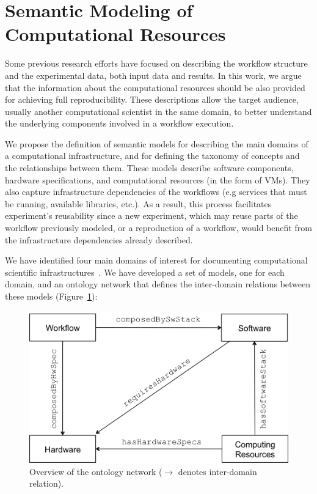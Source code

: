 \section{Semantic Modeling of Computational Resources}
\label{sec:semantic}




Some previous research efforts have focused on describing the workflow structure and the 
experimental data, both input data and results. In this work, we argue that the information 
about the computational resources should be also provided for achieving full reproducibility. 
These descriptions allow the target audience, usually another computational scientist in the same domain, 
to better understand the underlying components involved in a workflow execution.

We propose the definition of semantic models for describing the main domains of a 
computational infrastructure, and for defining the taxonomy of concepts and the relationships 
between them. These models describe software components, hardware specifications, 
and computational resources (in the form of VMs). They also capture infrastructure 
dependencies of the workflows (e.g services that must be running, available libraries, etc.).
 As a result, this process facilitates experiment's reusability since 
a new experiment, which may reuse parts of the workflow previously modeled, or a reproduction 
of a workflow, would benefit from the infrastructure dependencies already described.

We have identified four main domains of interest for documenting computational scientific 
infrastructures~\cite{wicus}. We have developed a set of models, one for each domain, 
and an ontology network that defines the inter-domain relations between these models 
(Figure~\ref{fig:wicusrels}):

\begin{figure}[!b]
	\centering
	\includegraphics[width=.9\linewidth]{figures/wicusrels}
	\caption{Overview of the ontology network ($\rightarrow$ denotes inter-domain relation).}
	\label{fig:wicusrels}
\end{figure}

